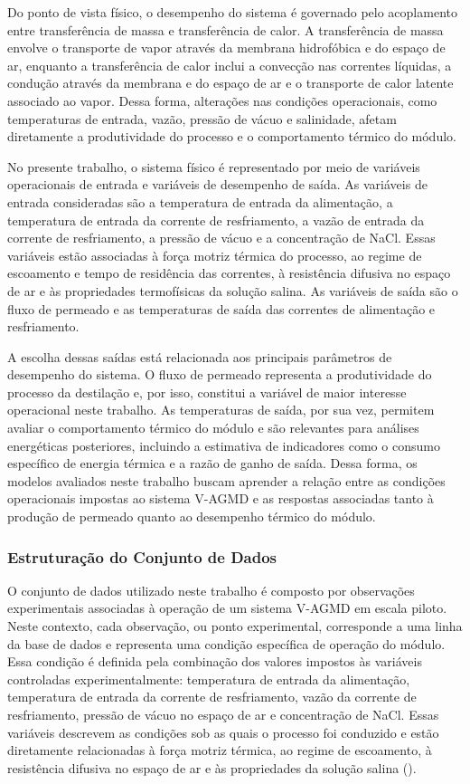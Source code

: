 Do ponto de vista físico, o desempenho do sistema é governado pelo acoplamento entre transferência de massa e transferência de calor. A transferência de massa envolve o transporte de vapor através da membrana hidrofóbica e do espaço de ar, enquanto a transferência de calor inclui a convecção nas correntes líquidas, a condução através da membrana e do espaço de ar e o transporte de calor latente associado ao vapor. Dessa forma, alterações nas condições operacionais, como temperaturas de entrada, vazão, pressão de vácuo e salinidade, afetam diretamente a produtividade do processo e o comportamento térmico do módulo.

No presente trabalho, o sistema físico é representado por meio de variáveis operacionais de entrada e variáveis de desempenho de saída. As variáveis de entrada consideradas são a temperatura de entrada da alimentação, a temperatura de entrada da corrente de resfriamento, a vazão de entrada da corrente de resfriamento, a pressão de vácuo e a concentração de NaCl. Essas variáveis estão associadas à força motriz térmica do processo, ao regime de escoamento e tempo de residência das correntes, à resistência difusiva no espaço de ar e às propriedades termofísicas da solução salina. As variáveis de saída são o fluxo de permeado e as temperaturas de saída das correntes de alimentação e resfriamento.

A escolha dessas saídas está relacionada aos principais parâmetros de desempenho do sistema. O fluxo de permeado representa a produtividade do processo da destilação e, por isso, constitui a variável de maior interesse operacional neste trabalho. As temperaturas de saída, por sua vez, permitem avaliar o comportamento térmico do módulo e são relevantes para análises energéticas posteriores, incluindo a estimativa de indicadores como o consumo específico de energia térmica e a razão de ganho de saída. Dessa forma, os modelos avaliados neste trabalho buscam aprender a relação entre as condições operacionais impostas ao sistema V-AGMD e as respostas associadas tanto à produção de permeado quanto ao desempenho térmico do módulo.

\subsubsection{Estruturação do Conjunto de Dados}

O conjunto de dados utilizado neste trabalho é composto por observações experimentais associadas à operação de um sistema V-AGMD em escala piloto. Neste contexto, cada observação, ou ponto experimental, corresponde a uma linha da base de dados e representa uma condição específica de operação do módulo. Essa condição é definida pela combinação dos valores impostos às variáveis controladas experimentalmente: temperatura de entrada da alimentação, temperatura de entrada da corrente de resfriamento, vazão da corrente de resfriamento, pressão de vácuo no espaço de ar e concentração de NaCl. Essas variáveis descrevem as condições sob as quais o processo foi conduzido e estão diretamente relacionadas à força motriz térmica, ao regime de escoamento, à resistência difusiva no espaço de ar e às propriedades da solução salina (\cite{Lisboa2024}).

